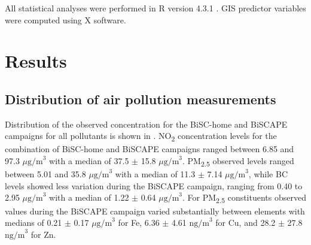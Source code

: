 \documentclass{article}
\begin{document}
All statistical analyses were performed in R version 4.3.1 \cite{Rstudio}. GIS predictor variables were computed using X software. 


\section{Results}

\subsection{Distribution of air pollution measurements}

Distribution of the observed concentration for the BiSC-home and BiSCAPE campaigns for all pollutants is shown in . NO\textsubscript{2} concentration levels for the combination of BiSC-home and BiSCAPE campaigns ranged between 6.85 and 97.3 \(\mu \text{g/m}^3\) with a median of  37.5 \(\pm\) 15.8 \( \mu \text{g/m}^3\). PM\textsubscript{2.5} observed levels ranged between 5.01 and 35.8 \( \mu \text{g/m}^3\) with a median of 11.3 \(\pm\) 7.14 \(\mu \text{g/m}^3\), while BC levels showed less variation during the BiSCAPE campaign, ranging from 0.40 to 2.95 \(  \mu \text{g/m}^3\) with a median of 1.22 \(\pm\) 0.64 \( \mu \text{g/m}^3\). For PM\textsubscript{2.5} constituents  observed values during the BiSCAPE campaign varied substantially between elements with medians of 0.21 \(\pm\) 0.17 \(  \mu \text{g/m}^3\)  for  Fe,  6.36 \(\pm\) 4.61 \( \text{ng/m}^3 \) for Cu, and 28.2 \(\pm\) 27.8 \( \text{ng/m}^3 \) for Zn. 
\end{document}
